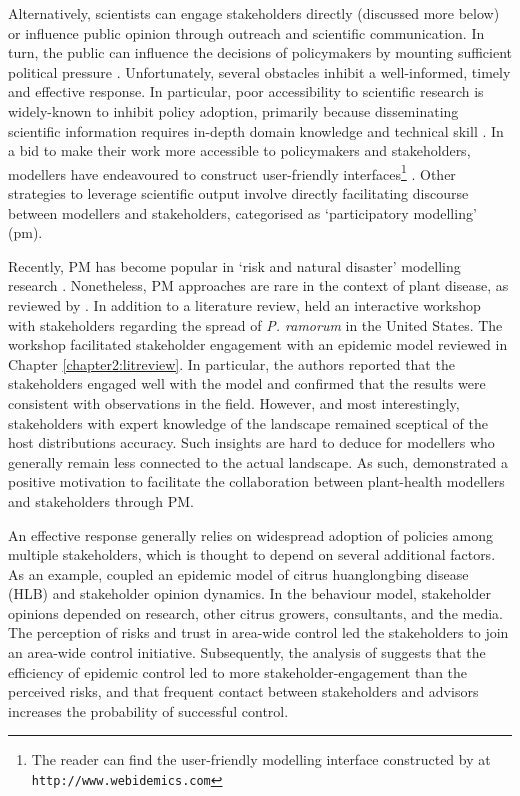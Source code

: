 Alternatively, scientists can engage stakeholders directly (discussed more below) or influence public opinion through outreach and
scientific communication. In turn, the public can influence the decisions of policymakers by
mounting sufficient political pressure \cite{fuller2016public}.
Unfortunately, several obstacles inhibit a well-informed, timely and effective response. 
In particular, poor accessibility to scientific research is widely-known to inhibit policy adoption, 
primarily because disseminating scientific information requires in-depth domain knowledge and technical skill \cite{jones2020modelling}.
In a bid to make their work more accessible to policymakers and stakeholders, modellers have endeavoured to construct user-friendly interfaces\footnote{
The reader can find the user-friendly modelling interface constructed by \cite{WEBIDEMICS} at \nolinkurl{http://www.webidemics.com}} \cite{WEBIDEMICS}.
Other strategies to leverage scientific output involve directly facilitating discourse between modellers and stakeholders, categorised as `participatory modelling' (\acrshort{pm}).

Recently, PM has become popular in `risk and natural disaster' modelling research \cite{hamalainen2020leadership, ravera2020participatory, hedelin2017participatory}.
Nonetheless, PM approaches are rare in the context of plant disease, as reviewed by \cite{gaydos2019forecasting}.
In addition to a literature review, \cite{gaydos2019forecasting} held an interactive workshop with stakeholders
regarding the spread of \textit{P. ramorum} in the United States. The workshop facilitated stakeholder engagement
with an epidemic model \cite{tonini2017tangible}\textemdash reviewed in Chapter \ref{chapter2:litreview}. In particular, the authors reported
that the stakeholders engaged well with the model and confirmed that the results were consistent with observations in the field. However, and most interestingly, stakeholders with expert knowledge of the landscape remained sceptical of the host distributions accuracy. 
Such insights are hard to deduce for modellers who generally remain less connected to the actual landscape. 
As such, \cite{tonini2017tangible} demonstrated a positive motivation to facilitate the collaboration 
between plant-health modellers and stakeholders through PM.

An effective response generally relies on widespread adoption of policies among multiple 
stakeholders, which is thought to depend on several additional factors. As an example, \cite{milne2020makes} coupled
an epidemic model of citrus huanglongbing disease (HLB) and stakeholder opinion dynamics. In the behaviour model, stakeholder
opinions depended on research, other citrus growers, consultants, and the media. The perception of risks and trust in
area-wide control led the stakeholders to join an area-wide control initiative. Subsequently, the analysis of 
\cite{milne2020makes} suggests that the efficiency of epidemic control led to more stakeholder-engagement than the perceived risks, and that frequent contact between stakeholders and advisors increases the probability of successful control.

